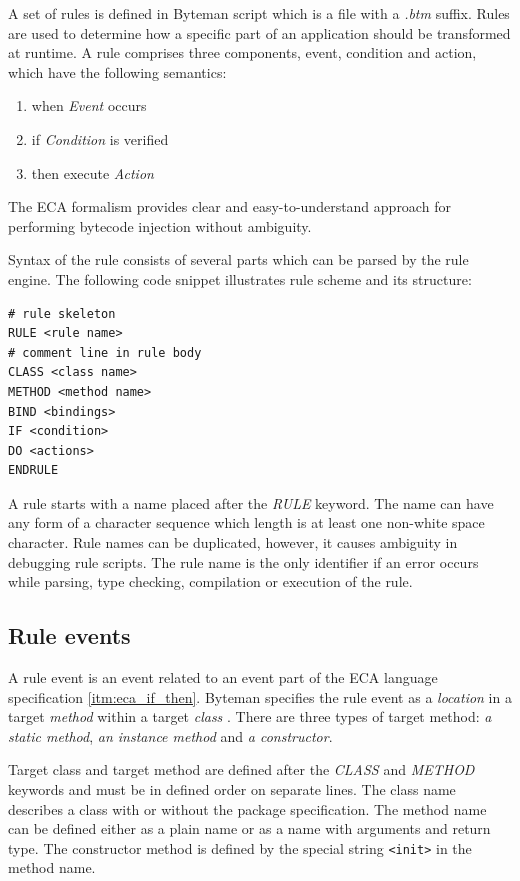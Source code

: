 \documentclass[12pt,oneside]{fithesis2}
\begin{document}
A set of rules is defined in Byteman script which is a file with a \textit{.btm} suffix. Rules are used to determine how a specific part of an application should be transformed at runtime. A rule comprises three components, event, condition and action, which have the following semantics\cite{eca}:

\begin{enumerate}
\label{itm:eca_if_then}
   \item when \textit{Event} occurs
   \item if \textit{Condition} is verified
   \item then execute \textit{Action}
\end{enumerate}

The ECA formalism provides clear and easy-to-understand approach for performing bytecode injection without ambiguity.

Syntax of the rule consists of several parts which can be parsed by the rule engine. The following code snippet illustrates rule scheme and its structure:

\begin{lstlisting}[caption = Byteman rule scheme \cite{byteman_doc}, label = byteman_scheme]
# rule skeleton
RULE <rule name>
# comment line in rule body
CLASS <class name>
METHOD <method name>
BIND <bindings>
IF <condition>
DO <actions>
ENDRULE
\end{lstlisting}

A rule starts with a name placed after the \textit{RULE} keyword. The name can have any form of a character sequence which length is at least one non-white space character. Rule names can be duplicated, however, it causes ambiguity in debugging rule scripts. The rule name is the only identifier if an error occurs while parsing, type checking, compilation or execution of the rule.

\subsection{Rule events}
\label{subsec:rule_events}
A rule event is an event related to an event part of the ECA language specification \ref{itm:eca_if_then}. Byteman specifies the rule event as a \textit{location} in a target \textit{method} within a target \textit{class} \cite[Rule Events]{byteman_doc}. There are three types of target method: \textit{a static method}, \textit{an instance method} and \textit{a constructor}.

Target class and target method are defined after the \textit{CLASS} and \textit{METHOD} keywords and must be in defined order on separate lines. The class name describes a class with or without the package specification. The method name can be defined either as a plain name or as a name with arguments and return type. The constructor method is defined by the special string \verb|<init>| in the method name.
\end{document}
